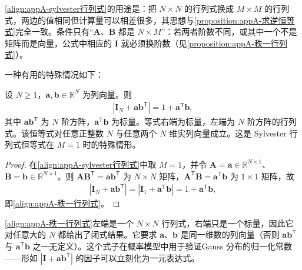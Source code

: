 \documentclass[../main.tex]{subfiles}
\begin{document}
\begin{remark}
\eqref{align:appA-sylvester行列式}的用途是：把 $N\times N$ 的行列式换成 $M\times M$ 的行列式，两边的值相同但计算量可以相差很多，其思想与\cref{proposition:appA-求逆恒等式}完全一致。条件只有“$\bm{A}$、$\bm{B}$ 都是 $N\times M$”：若两者阶数不同，或其中一个不是矩阵而是向量，公式中相应的 $\bm{I}$ 就必须换阶数（见\cref{proposition:appA-秩一行列式}）。
\end{remark}

一种有用的特殊情况如下：
\begin{proposition}[秩1 行列式恒等式]\label{proposition:appA-秩一行列式}
设 $N\geqslant1$，$\bm{a},\bm{b}\in\mathbb{R}^{N}$ 为列向量。则
\begin{align}
  |\bm{I}_N+\bm{a}\bm{b}^{\mathsf{T}}|=1+\bm{a}^{\mathsf{T}}\bm{b},
  \label{align:appA-秩一行列式}
\end{align}
其中 $\bm{a}\bm{b}^{\mathsf{T}}$ 为 $N$ 阶方阵，$\bm{a}^{\mathsf{T}}\bm{b}$ 为标量。等式右端为标量，左端为 $N$ 阶方阵的行列式。该恒等式对任意正整数 $N$ 与任意两个 $N$ 维实列向量成立。这是 Sylvester 行列式恒等式在 $M=1$ 时的特殊情形。
\end{proposition}

\begin{proof}
在\eqref{align:appA-sylvester行列式}中取 $M=1$，并令 $\bm{A}=\bm{a}\in\mathbb{R}^{N\times1}$、$\bm{B}=\bm{b}\in\mathbb{R}^{N\times1}$。则 $\bm{A}\bm{B}^{\mathsf{T}}=\bm{a}\bm{b}^{\mathsf{T}}$ 为 $N\times N$ 矩阵，$\bm{A}^{\mathsf{T}}\bm{B}=\bm{a}^{\mathsf{T}}\bm{b}$ 为 $1\times1$ 矩阵，故
\begin{align*}
 |\bm{I}_{N}+\bm{a}\bm{b}^{\mathsf{T}}|=|\bm{I}_{1}+\bm{a}^{\mathsf{T}}\bm{b}|=1+\bm{a}^{\mathsf{T}}\bm{b},
\end{align*}
即\eqref{align:appA-秩一行列式}。
\end{proof}

\begin{remark}
\eqref{align:appA-秩一行列式}左端是一个 $N\times N$ 行列式，右端只是一个标量，因此它对任意大的 $N$ 都给出了闭式结果。它要求 $\bm{a}$、$\bm{b}$ 是同一维数的列向量（否则 $\bm{a}\bm{b}^{\mathsf{T}}$ 与 $\bm{a}^{\mathsf{T}}\bm{b}$ 之一无定义）。这个式子在概率模型中用于验证Gauss 分布的归一化常数——形如 $|\bm{I}+\bm{a}\bm{b}^{\mathsf{T}}|$ 的因子可以立刻化为一元表达式。
\end{remark}
\end{document}
